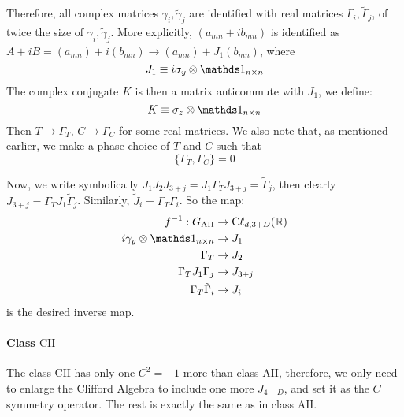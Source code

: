 \documentclass{article}
\begin{document}
Therefore, all complex matrices $\gamma_i,\tilde{\gamma}_j$ are identified with
real matrices $\Gamma_i,\tilde{\Gamma}_j$, of twice the size of
$\gamma_i,\tilde{\gamma}_j$. More explicitly, $(a_{mn}+i b_{mn})$ is identified
as $A+iB = (a_{mn})+i(b_{mn}) \to (a_{mn})+J_1(b_{mn})$, where
\begin{equation}
    J_1 \equiv i\sigma_y \otimes \id_{n\times n}
\end{equation}
The complex conjugate $K$ is then a matrix anticommute with $J_1$, we define:
\begin{equation}
    K \equiv \sigma_z \otimes \id_{n\times n}
\end{equation}
Then $T\to \Gamma_T$, $C\to \Gamma_C$ for some real matrices.  We also note
that, as mentioned earlier, we make a phase choice of $T$ and $C$ such that
\begin{equation}
    \{\Gamma_T,\Gamma_C\} = 0
\end{equation}

Now, we write symbolically $J_1J_2J_{3+j} = J_1 \Gamma_T J_{3+j} =
\tilde{\Gamma}_j$, then clearly $J_{3+j} = \Gamma_T J_1\tilde{\Gamma}_j$.
Similarly, $\tilde{J}_i = \Gamma_T\Gamma_i$. So the map:
\begin{align}
    f^{-1}: G_{\mathrm{AII}} &\to \mathrm{C\ell}_{d,3+D}(\R) \\
    i\gamma_y \otimes \id_{n\times n} &\to J_1 \nonumber\\
    \Gamma_T &\to J_2 \nonumber\\
    \Gamma_TJ_1\Gamma_j &\to J_{3+j} \nonumber\\
    \Gamma_T\tilde{\Gamma}_i &\to J_{i} \nonumber
\end{align}
is the desired inverse map.

\paragraph{Class $\mathrm{CII}$} The class $\mathrm{CII}$ has only one $C^2=-1$
more than class $\mathrm{AII}$, therefore, we only need to enlarge the Clifford
Algebra to include one more $J_{4+D}$, and set it as the $C$ symmetry operator.
The rest is exactly the same as in class $\mathrm{AII}$.
\end{document}
